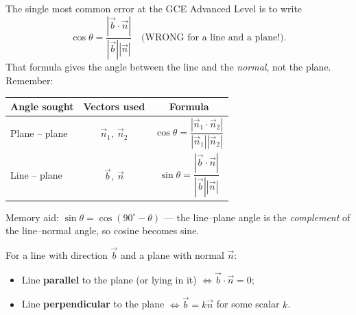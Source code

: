 \documentclass[11pt]{article}
\begin{document}
\begin{attention}
The single most common error at the GCE Advanced Level is to write
\[
\cos\theta=\frac{|\vec{b}\cdot\vec{n}|}{|\vec{b}||\vec{n}|} \quad \text{(WRONG for a line and a plane!).}
\]
That formula gives the angle between the line and the \emph{normal}, not the plane. Remember:
\begin{center}
\begin{tabular}{|l|c|c|}
\hline
\rowcolor{popblueL} \textbf{Angle sought} & \textbf{Vectors used} & \textbf{Formula} \\
\hline
Plane -- plane & $\vec{n}_1,\ \vec{n}_2$ & $\cos\theta=\dfrac{|\vec{n}_1\cdot\vec{n}_2|}{|\vec{n}_1||\vec{n}_2|}$ \\
\hline
Line -- plane & $\vec{b},\ \vec{n}$ & $\sin\theta=\dfrac{|\vec{b}\cdot\vec{n}|}{|\vec{b}||\vec{n}|}$ \\
\hline
\end{tabular}
\end{center}
Memory aid: $\sin\theta=\cos(90^\circ-\theta)$ — the line--plane angle is the \emph{complement} of the line--normal angle, so cosine becomes sine.
\end{attention}

\begin{propriete}
For a line with direction $\vec{b}$ and a plane with normal $\vec{n}$:
\begin{itemize}
\item Line \textbf{parallel} to the plane (or lying in it) $\iff \vec{b}\cdot\vec{n}=0$;
\item Line \textbf{perpendicular} to the plane $\iff \vec{b}=k\vec{n}$ for some scalar $k$.
\end{itemize}
\end{propriete}
\end{document}
